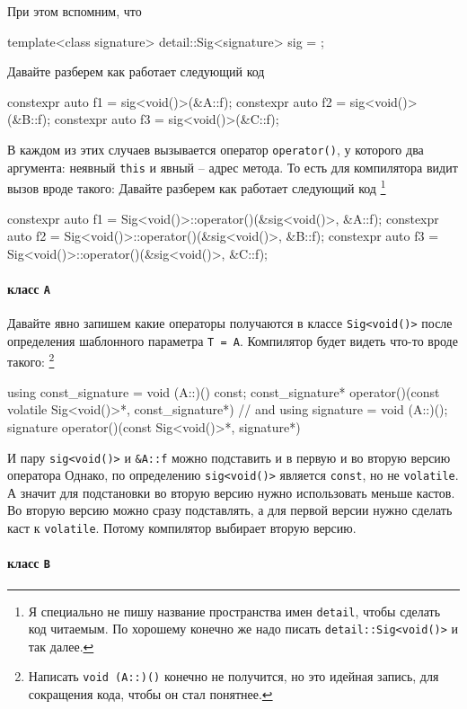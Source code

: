 При этом вспомним, что
\begin{cppcode}
template<class signature>
detail::Sig<signature> sig = {};
\end{cppcode}
Давайте разберем как работает следующий код
\begin{cppcode}
constexpr auto f1 = sig<void()>(&A::f);
constexpr auto f2 = sig<void()>(&B::f);
constexpr auto f3 = sig<void()>(&C::f);
\end{cppcode}
В каждом из этих случаев вызывается оператор \verb"operator()", у которого два аргумента: неявный	 \verb"this" и явный -- адрес метода.
То есть для компилятора видит вызов вроде такого:
Давайте разберем как работает следующий код%
\footnote{Я специально не пишу название пространства имен \verb"detail", чтобы сделать код читаемым.
По хорошему конечно же надо писать \verb"detail::Sig<void()>" и так далее.}
\begin{cppcode}
constexpr auto f1 = Sig<void()>::operator()(&sig<void()>, &A::f);
constexpr auto f2 = Sig<void()>::operator()(&sig<void()>, &B::f);
constexpr auto f3 = Sig<void()>::operator()(&sig<void()>, &C::f);
\end{cppcode}

\paragraph{класс \texttt{A}}

Давайте явно запишем какие операторы получаются в классе \verb"Sig<void()>" после определения шаблонного параметра \verb"T = A".
Компилятор будет видеть что-то вроде такого:%
\footnote{Написать \texttt{void (A::)()} конечно не получится, но это идейная запись, для сокращения кода, чтобы он стал понятнее.}
\begin{cppcode}[numbers = none]
using const_signature = void (A::)() const;
const_signature* operator()(const volatile Sig<void()>*, const_signature*)
// and
using signature = void (A::)();
signature operator()(const Sig<void()>*, signature*)
\end{cppcode}
И пару \verb"sig<void()>" и \verb"&A::f" можно подставить и в первую и во вторую версию оператора
Однако, по определению \verb"sig<void()>" является \verb"const", но не \verb"volatile".
А значит для подстановки во вторую версию нужно использовать меньше кастов.
Во вторую версию можно сразу подставлять, а для первой версии нужно сделать каст к \verb"volatile".
Потому компилятор выбирает вторую версию.

\paragraph{класс \texttt{B}}

